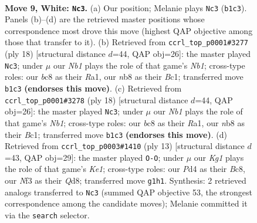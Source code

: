 \documentclass[11pt]{article}
\begin{document}
\clearpage

\begin{figure}[p]\centering
\begin{subfigure}{0.46\textwidth}\centering
\resizebox{\linewidth}{!}{%
\newchessgame
\chessboard[
  setfen={rnbq1rk1/pp4pp/2pbpn2/5p2/2PP4/5NP1/P3PPBP/RNBQ1RK1 w - - 1 9},
  showmover=false,
  pgfstyle=straightmove, color=movearrow, markmove={b1-c3}
]}
\caption{}
\end{subfigure}\hfill
\begin{subfigure}{0.46\textwidth}\centering
\resizebox{\linewidth}{!}{%
\newchessgame
\chessboard[
  setfen={rnbq1rk1/1p2ppbp/5np1/3p4/p2P4/5NP1/PP2PPBP/RNBQ1RK1 w - - 0 10},
  showmover=false,
  pgfstyle=straightmove, color=movearrow, markmove={b1-c3}
]}
\caption{}
\end{subfigure}
\\[4pt]
\begin{subfigure}{0.46\textwidth}\centering
\resizebox{\linewidth}{!}{%
\newchessgame
\chessboard[
  setfen={rnbq1rk1/1p2ppbp/5np1/3p4/p2P4/5NP1/PP2PPBP/RNBQ1RK1 w - - 0 10},
  showmover=false,
  pgfstyle=straightmove, color=movearrow, markmove={b1-c3}
]}
\caption{}
\end{subfigure}\hfill
\begin{subfigure}{0.46\textwidth}\centering
\resizebox{\linewidth}{!}{%
\newchessgame
\chessboard[
  setfen={rnbqk2r/pp2ppbp/5np1/3p4/3P4/2PB1N2/PP3PPP/RNBQ1RK1 b kq - 2 7},
  showmover=false,
  pgfstyle=straightmove, color=movearrow, markmove={e8-g8}
]}
\caption{}
\end{subfigure}
\caption{\textbf{Move 9, White: \texttt{Nc3}.} (a) Our position; Melanie plays \texttt{Nc3} (\texttt{b1c3}). Panels (b)--(d) are the retrieved master positions whose correspondence most drove this move (highest QAP objective among those that transfer to it). (b) Retrieved from \texttt{ccrl\_top\_p0001\#3277} (ply 18) [structural distance $d$=44, QAP obj=26]: the master played \texttt{Nc3}; under $\mu$ our \emph{Nb1} plays the role of that game's \emph{Nb1}; cross-type roles: our \emph{b}c8 as their \emph{R}a1, our \emph{n}b8 as their \emph{B}c1; transferred move \texttt{b1c3} \textbf{(endorses this move)}. (c) Retrieved from \texttt{ccrl\_top\_p0001\#3278} (ply 18) [structural distance $d$=44, QAP obj=26]: the master played \texttt{Nc3}; under $\mu$ our \emph{Nb1} plays the role of that game's \emph{Nb1}; cross-type roles: our \emph{b}c8 as their \emph{R}a1, our \emph{n}b8 as their \emph{B}c1; transferred move \texttt{b1c3} \textbf{(endorses this move)}. (d) Retrieved from \texttt{ccrl\_top\_p0003\#1410} (ply 13) [structural distance $d$=43, QAP obj=29]: the master played \texttt{O-O}; under $\mu$ our \emph{Kg1} plays the role of that game's \emph{Ke1}; cross-type roles: our \emph{P}d4 as their \emph{B}c8, our \emph{N}f3 as their \emph{Q}d8; transferred move \texttt{g1h1}. Synthesis: 2 retrieved analogs transferred to \texttt{Nc3} (summed QAP objective 53, the strongest correspondence among the candidate moves); Melanie committed it via the \texttt{search} selector.}
\label{fig:thought-m16}
\end{figure}
\end{document}
